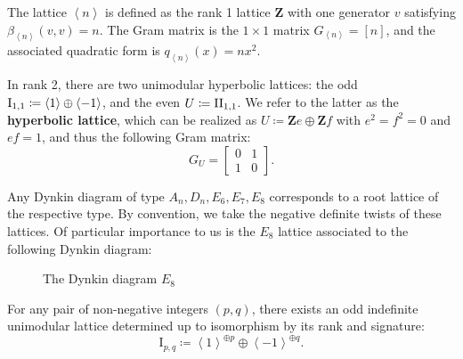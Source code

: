 \documentclass{amsart}
\begin{document}
\begin{remark}

The lattice \(\left\langle{n}\right\rangle\) is defined as the rank 1 lattice \({\mathbf{Z}}\) with one generator \(v\) satisfying \(\beta_{\left\langle{n}\right\rangle}(v,v) = n\). The Gram matrix is the \(1\times 1\) matrix \(G_{\left\langle{n}\right\rangle} = [n]\), and the associated quadratic form is \(q_{\left\langle{n}\right\rangle}(x) = nx^2\).

\end{remark}

\begin{remark}

In rank 2, there are two unimodular hyperbolic lattices: the odd \(\rm{I}_{1, 1} \coloneqq\left\langle{1}\right\rangle \oplus \left\langle{-1}\right\rangle\), and the even \(U\coloneqq\rm{II}_{1, 1}\). We refer to the latter as the \textbf{hyperbolic lattice}, which can be realized as \(U \coloneqq{\mathbf{Z}}e \oplus {\mathbf{Z}}f\) with \(e^2=f^2 = 0\) and \(ef = 1\), and thus the following Gram matrix: \[ 
G_U = \begin{bmatrix}0&1\\1&0\end{bmatrix}
.\]

\end{remark}

\begin{remark}

Any Dynkin diagram of type \(A_n, D_n, E_6, E_7, E_8\) corresponds to a root lattice of the respective type. By convention, we take the negative definite twists of these lattices. Of particular importance to us is the \(E_8\) lattice associated to the following Dynkin diagram:

\begin{figure}[H]
\centering

\caption{The Dynkin diagram $E_{8}$}
\label{fig:e8-coxeter-diagram}
\end{figure}

\end{remark}

\begin{remark}

For any pair of non-negative integers \((p, q)\), there exists an odd indefinite unimodular lattice determined up to isomorphism by its rank and signature: \[
\mathrm{I}_{p, q} \coloneqq\left\langle{1}\right\rangle^{\oplus p}\oplus \left\langle{-1}\right\rangle^{\oplus q}
.\]

\end{remark}
\end{document}
